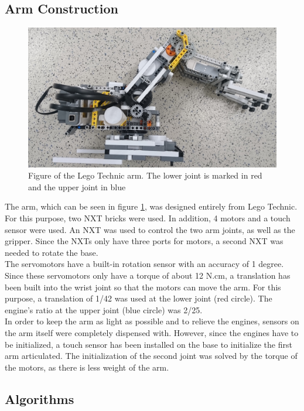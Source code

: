 \documentclass[conference]{IEEEtran}
\begin{document}
\subsection{Arm Construction}\label{sec:construction}
\begin{figure}[bt] 
	\centering
	\includegraphics[width=\textwidth/2]{img/arm_full}
	\caption[caption]{Figure of the Lego Technic arm. The lower joint is marked in red and the upper joint in blue}
	\label{fig:arm_full}
\end{figure}
The arm, which can be seen in figure \ref{fig:arm_full}, was designed entirely from Lego Technic. For this purpose, two NXT bricks were used. In addition, 4 motors and a touch sensor were used. An NXT was used to control the two arm joints, as well as the gripper. Since the NXTs only have three ports for motors, a second NXT was needed to rotate the base.\\
The servomotors have a built-in rotation sensor with an accuracy of 1 degree. Since these servomotors only have a torque of about 12 N.cm, a translation has been built into the wrist joint so that the motors can move the arm. For this purpose, a translation of 1/42 was used at the lower joint (red circle). The engine's ratio at the upper joint (blue circle) was 2/25.\\
In order to keep the arm as light as possible and to relieve the engines, sensors on the arm itself were completely dispensed with. However, since the engines have to be initialized, a touch sensor has been installed on the base to initialize the first arm articulated. The initialization of the second joint was solved by the torque of the motors, as there is less weight of the arm.

\subsection{Algorithms}\label{sec:algorithms}
\end{document}
